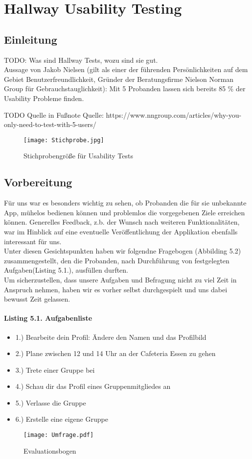 \documentclass[a4paper]{scrreprt}
\begin{document}
\chapter{Hallway Usability Testing}

\section{Einleitung}
TODO: Was sind Hallway Tests, wozu sind sie gut. \\

Aussage von Jakob Nielsen (gilt als einer der führenden Persönlichkeiten auf dem Gebiet Benutzerfreundlichkeit, Gründer der Beratungsfirme Nielson Norman Group für Gebrauchstauglichkeit): Mit 5 Probanden lassen sich bereits 85 \% der Usability Probleme finden.

TODO Quelle in Fußnote
Quelle:  https://www.nngroup.com/articles/why-you-only-need-to-test-with-5-users/ 
\begin{figure}[ht]
	\centering
  \texttt{[image: Stichprobe.jpg]}
	\caption{Stichprobengröße für Usability Tests}
	\label{fig2}
\end{figure}
\newpage
\section{Vorbereitung}
Für uns war es besonders wichtig zu sehen, ob Probanden die für sie unbekannte App, mühelos bedienen können und problemlos die vorgegebenen Ziele erreichen können.
Generelles Feedback, z.b. der Wunsch nach weiteren Funktionalitäten, war im Hinblick auf eine eventuelle Veröffentlichung der Applikation ebenfalls interessant für uns. \\
Unter diesen Gesichtspunkten haben wir folgendne Fragebogen (Abbilding 5.2) zusammengestellt, den die Probanden, nach Durchführung von festgelegten Aufgaben(Listing 5.1.), ausfüllen durften.\\
Um sicherzustellen, dass unsere Aufgaben und Befragung nicht zu viel Zeit in Anspruch nehmen, haben wir es vorher selbst durchgespielt und uns dabei bewusst Zeit gelassen.



\subsubsection*{Listing 5.1. Aufgabenliste}
\begin{itemize}
	\item 1.) Bearbeite dein Profil: Ändere den Namen und das Profilbild
	\item 2.) Plane zwischen 12 und 14 Uhr an der Cafeteria Essen zu gehen
	\item 3.) Trete einer Gruppe bei
	\item 4.) Schau dir das Profil eines Gruppenmitgliedes an
	\item 5.) Verlasse die Gruppe
	\item 6.) Erstelle eine eigene Gruppe
\end{itemize}
\newpage
\begin{figure}[H]
	\centering
  \texttt{[image: Umfrage.pdf]}
	\caption{Evaluationsbogen}
	\label{fig2}
\end{figure}
\newpage
\end{document}
